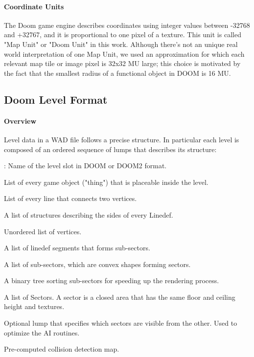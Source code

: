 \paragraph{Coordinate Units} \label{par:coords} The Doom game engine describes coordinates using integer values between -32768 and +32767, and it is proportional to one pixel of a texture. This unit is called "Map Unit" or "Doom Unit" in this work. Although there's not an unique real world interpretation of one Map Unit, we used an approximation for which each relevant map tile or image pixel is 32x32 MU large; this choice is motivated by the fact that the smallest radius of a functional object in DOOM is 16 MU. 

\newpage

\subsection{Doom Level Format}
\paragraph{Overview} Level data in a \gls{WAD} file follows a precise structure. In particular each level is composed of an ordered sequence of lumps that describes its structure:
	\begin{description}[wide=\parindent]
		\item[(NAME)]: Name of the level slot in DOOM or DOOM2 format.
		\item[THINGS] List of every game object ("\gls{thing}") that is placeable inside the level.
		\item[LINEDEFS] List of every line that connects two vertices.
		\item[SIDEDEFS] A list of structures describing the sides of every Linedef.
		\item[VERTEXES] Unordered list of vertices.
		\item[SEGS] A list of linedef segments that forms sub-sectors.
		\item[SSECTORS] A list of sub-sectors, which are convex shapes forming sectors.
		\item[NODES] A binary tree sorting sub-sectors for speeding up the rendering process.
		\item[SECTORS] A list of Sectors. A \gls{sector} is a closed area that has the same floor and ceiling height and textures.
		\item[REJECT] Optional lump that specifies which sectors are visible from the other. Used to optimize the AI routines.
		\item[BLOCKMAP] Pre-computed collision detection map. 
	\end{description}

